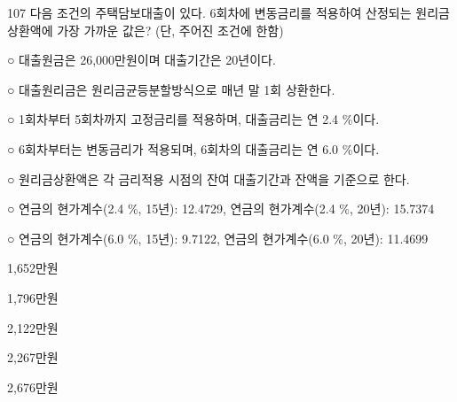 \begin{question}{107}
다음 조건의 주택담보대출이 있다. 6회차에 변동금리를 적용하여 산정되는 원리금상환액에 가장 가까운 값은? (단, 주어진 조건에 한함)
\begin{framedtext}
○ 대출원금은 26,000만원이며 대출기간은 20년이다. \par
○ 대출원리금은 원리금균등분할방식으로 매년 말 1회 상환한다. \par
○ 1회차부터 5회차까지 고정금리를 적용하며, 대출금리는 연 2.4 \%이다. \par
○ 6회차부터는 변동금리가 적용되며, 6회차의 대출금리는 연 6.0 \%이다. \par
○ 원리금상환액은 각 금리적용 시점의 잔여 대출기간과 잔액을 기준으로 한다. \par
○ 연금의 현가계수(2.4 \%, 15년): 12.4729, 연금의 현가계수(2.4 \%, 20년): 15.7374 \par
○ 연금의 현가계수(6.0 \%, 15년): 9.7122, 연금의 현가계수(6.0 \%, 20년): 11.4699 \par
\end{framedtext}
\begin{choices}
  \item 1,652만원
  \item 1,796만원
  \item 2,122만원
  \item 2,267만원
  \item 2,676만원
\end{choices}
\end{question}
